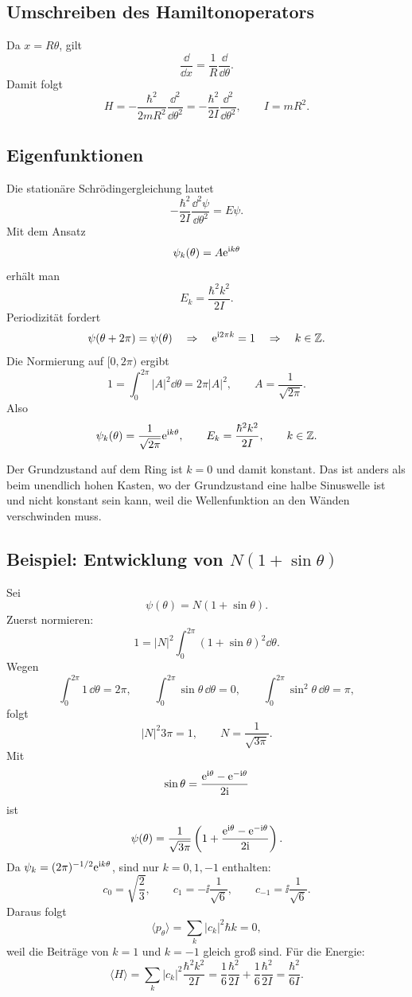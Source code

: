 \subsection{Umschreiben des Hamiltonoperators}

Da $x=R\theta$, gilt
\[
    \frac{\dd}{\dd x}=\frac{1}{R}\frac{\dd}{\dd\theta}.
\]
Damit folgt
\[
    H=-\frac{\hbar^2}{2mR^2}\frac{\dd^2}{\dd\theta^2}
    =-\frac{\hbar^2}{2I}\frac{\dd^2}{\dd\theta^2},
    \qquad
    I=mR^2.
\]

\subsection{Eigenfunktionen}

Die stationäre Schrödingergleichung lautet
\[
    -\frac{\hbar^2}{2I}\frac{\dd^2\psi}{\dd\theta^2}=E\psi.
\]
Mit dem Ansatz
\[
    \psi_k(\theta)=A\mathrm{e}^{\mathrm{i} k\theta}
\]
erhält man
\[
    E_k=\frac{\hbar^2k^2}{2I}.
\]
Periodizität fordert
\[
    \psi(\theta+2\pi)=\psi(\theta)
    \quad\Rightarrow\quad
    \mathrm{e}^{\mathrm{i} 2\pi k}=1
    \quad\Rightarrow\quad
    k\in\mathbb Z.
\]
Die Normierung auf $[0,2\pi)$ ergibt
\[
    1=\int_0^{2\pi}|A|^2\dd\theta=2\pi|A|^2,
    \qquad
    A=\frac{1}{\sqrt{2\pi}}.
\]
Also
\[
    \psi_k(\theta)=\frac{1}{\sqrt{2\pi}}\mathrm{e}^{\mathrm{i} k\theta},
    \qquad
    E_k=\frac{\hbar^2k^2}{2I},
    \qquad
    k\in\mathbb Z.
\]

\begin{examtipbox}
Der Grundzustand auf dem Ring ist $k=0$ und damit konstant. Das ist anders als beim unendlich hohen Kasten, wo der Grundzustand eine halbe Sinuswelle ist und nicht konstant sein kann, weil die Wellenfunktion an den Wänden verschwinden muss.
\end{examtipbox}

\subsection{Beispiel: Entwicklung von $N(1+\sin\theta)$}

Sei
\[
    \psi(\theta)=N(1+\sin\theta).
\]
Zuerst normieren:
\[
    1=|N|^2\int_0^{2\pi}(1+\sin\theta)^2\dd\theta.
\]
Wegen
\[
    \int_0^{2\pi}1\,\dd\theta=2\pi,
    \qquad
    \int_0^{2\pi}\sin\theta\,\dd\theta=0,
    \qquad
    \int_0^{2\pi}\sin^2\theta\,\dd\theta=\pi,
\]
folgt
\[
    |N|^2 3\pi=1,
    \qquad
    N=\frac{1}{\sqrt{3\pi}}.
\]
Mit
\[
    \sin\theta=\frac{\mathrm{e}^{\mathrm{i}\theta}-\mathrm{e}^{-\mathrm{i}\theta}}{2\mathrm{i}}
\]
ist
\[
    \psi(\theta)=\frac{1}{\sqrt{3\pi}}\left(1+\frac{\mathrm{e}^{\mathrm{i}\theta}-\mathrm{e}^{-\mathrm{i}\theta}}{2\mathrm{i}}\right).
\]
Da $\psi_k=(2\pi)^{-1/2}\mathrm{e}^{\mathrm{i} k\theta}$, sind nur $k=0,1,-1$ enthalten:
\[
    c_0=\sqrt{\frac{2}{3}},
    \qquad
    c_1=-\ii\frac{1}{\sqrt6},
    \qquad
    c_{-1}=\ii\frac{1}{\sqrt6}.
\]
Daraus folgt
\[
    \langle p_\theta\rangle=\sum_k |c_k|^2\hbar k=0,
\]
weil die Beiträge von $k=1$ und $k=-1$ gleich groß sind. Für die Energie:
\[
    \langle H\rangle=\sum_k |c_k|^2\frac{\hbar^2k^2}{2I}
    =\frac{1}{6}\frac{\hbar^2}{2I}+\frac{1}{6}\frac{\hbar^2}{2I}
    =\frac{\hbar^2}{6I}.
\]

